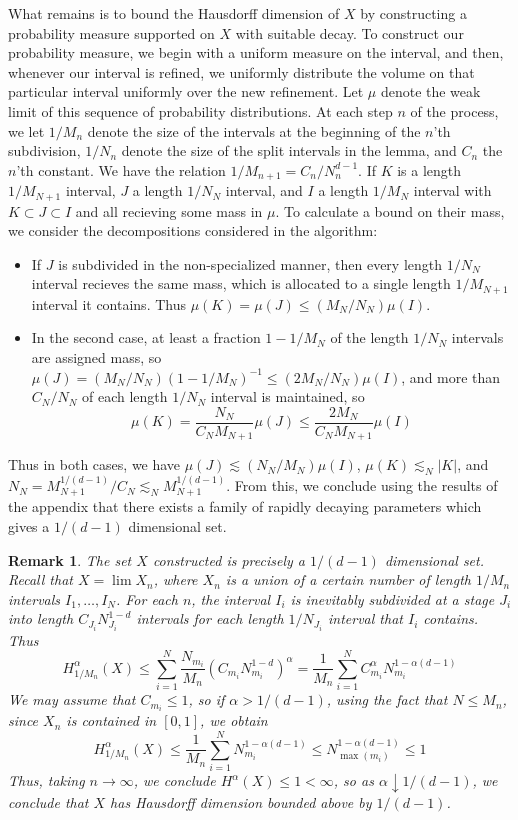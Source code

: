 \documentclass{report}
\theoremstyle{plain}
\theoremstyle{plain}
\newtheorem*{remark}{Remark}
\begin{document}
What remains is to bound the Hausdorff dimension of $X$ by constructing a probability measure supported on $X$ with suitable decay. To construct our probability measure, we begin with a uniform measure on the interval, and then, whenever our interval is refined, we uniformly distribute the volume on that particular interval uniformly over the new refinement. Let $\mu$ denote the weak limit of this sequence of probability distributions. At each step $n$ of the process, we let $1/M_n$ denote the size of the intervals at the beginning of the $n$'th subdivision, $1/N_n$ denote the size of the split intervals in the lemma, and $C_n$ the $n$'th constant. We have the relation $1/M_{n+1} = C_n/N_n^{d-1}$. If $K$ is a length $1/M_{N+1}$ interval, $J$ a length $1/N_N$ interval, and $I$ a length $1/M_N$ interval with $K \subset J \subset I$ and all recieving some mass in $\mu$. To calculate a bound on their mass, we consider the decompositions considered in the algorithm:
%
\begin{itemize}
        \item If $J$ is subdivided in the non-specialized manner, then every length $1/N_N$ interval recieves the same mass, which is allocated to a single length $1/M_{N+1}$ interval it contains. Thus $\mu(K) = \mu(J) \leq (M_N/N_N) \mu(I)$.
        \item In the second case, at least a fraction $1 - 1/M_N$ of the length $1/N_N$ intervals are assigned mass, so $\mu(J) = (M_N/N_N)(1 - 1/M_N)^{-1} \leq (2M_N/N_N) \mu(I)$, and more than $C_N/N_N$ of each length $1/N_N$ interval is maintained, so
        \[ \mu(K) = \frac{N_N}{C_NM_{N+1}} \mu(J) \leq \frac{2M_N}{C_NM_{N+1}} \mu(I) \]
\end{itemize}
%
Thus in both cases, we have $\mu(J) \lesssim (N_N/M_N) \mu(I)$, $\mu(K) \lesssim_N |K|$, and $N_N = M_{N+1}^{1/(d-1)}/C_N \lesssim_N M_{N+1}^{1/(d-1)}$. From this, we conclude using the results of the appendix that there exists a family of rapidly decaying parameters which gives a $1/(d-1)$ dimensional set.

\begin{remark}
    The set $X$ constructed is precisely a $1/(d-1)$ dimensional set. Recall that $X = \lim X_n$, where $X_n$ is a union of a certain number of length $1/M_n$ intervals $I_1, \dots, I_N$. For each $n$, the interval $I_i$ is inevitably subdivided at a stage $J_i$ into length $C_{J_i} N_{J_i}^{1-d}$ intervals for each length $1/N_{J_i}$ interval that $I_i$ contains. Thus
    \[ H_{1/M_n}^\alpha(X) \leq \sum_{i = 1}^N \frac{N_{m_i}}{M_n} (C_{m_i} N_{m_i}^{1-d})^\alpha = \frac{1}{M_n} \sum_{i = 1}^N C_{m_i}^\alpha N_{m_i}^{1 - \alpha(d-1)} \]
    We may assume that $C_{m_i} \leq 1$, so if $\alpha > 1/(d - 1)$, using the fact that $N \leq M_n$, since $X_n$ is contained in $[0,1]$, we obtain
    \[ H_{1/M_n}^\alpha(X) \leq \frac{1}{M_n} \sum_{i = 1}^N N_{m_i}^{1 - \alpha(d-1)} \leq N_{\max(m_i)}^{1 - \alpha(d-1)} \leq 1 \]
    Thus, taking $n \to \infty$, we conclude $H^\alpha(X) \leq 1 < \infty$, so as $\alpha \downarrow 1/(d - 1)$, we conclude that $X$ has Hausdorff dimension bounded above by $1/(d-1)$.
\end{remark}
\end{document}
